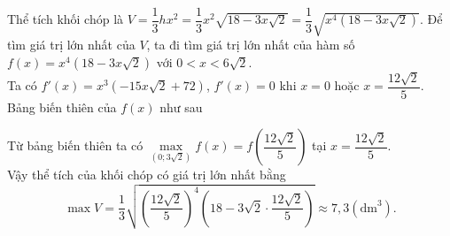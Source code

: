 \begin{bt}
{{}
		\noindent
		Thể tích khối chóp là $V=\dfrac{1}{3} hx^2=\dfrac{1}{3} x^2 \sqrt{18-3x\sqrt{2}}=\dfrac{1}{3}\sqrt{x^4(18-3x\sqrt{2})}$.
		Để tìm giá trị lớn nhất của $V$, ta đi tìm giá trị lớn nhất của hàm số $f(x)=x^4(18-3x\sqrt{2})$ với $0<x<6\sqrt{2}$.\\
		Ta có $f'(x)=x^3\left(-15x\sqrt{2}+72\right)$, $f'(x)=0$ khi $x=0$ hoặc $x=\dfrac{12\sqrt{2}}{5}$.\\
		Bảng biến thiên của $f(x)$ như sau
		\begin{center}
		\end{center}
		Từ bảng biến thiên ta có $\max\limits_{\left(0;3\sqrt{2}\right)}f(x)=f\left(\dfrac{12\sqrt{2}}{5}\right)$ tại $x=\dfrac{12\sqrt{2}}{5}$.\\
		Vậy thể tích của khối chóp có giá trị lớn nhất bằng
		$$\max V=\dfrac{1}{3}\sqrt{\left(\dfrac{12\sqrt{2}}{5}\right)^4\left(18-3\sqrt{2}\cdot \dfrac{12\sqrt{2}}{5}\right)} \approx 7{,}3 \left(\mathrm{dm}^3\right).$$\\
	}
\end{bt}

